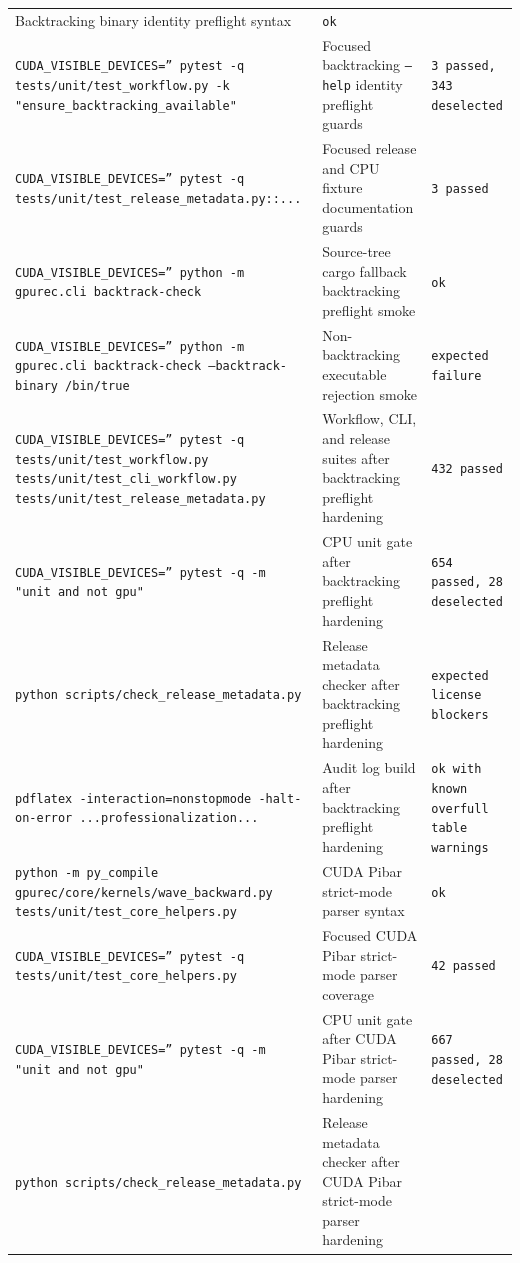\documentclass[11pt]{article}
\begin{document}
\begin{center}
\begin{tabular}{lll}
Backtracking binary identity preflight syntax &
\texttt{ok} \\
\texttt{CUDA\_VISIBLE\_DEVICES='' pytest -q tests/unit/test\_workflow.py -k "ensure\_backtracking\_available"} &
Focused backtracking \texttt{--help} identity preflight guards &
\texttt{3 passed, 343 deselected} \\
\texttt{CUDA\_VISIBLE\_DEVICES='' pytest -q tests/unit/test\_release\_metadata.py::...} &
Focused release and CPU fixture documentation guards &
\texttt{3 passed} \\
\texttt{CUDA\_VISIBLE\_DEVICES='' python -m gpurec.cli backtrack-check} &
Source-tree cargo fallback backtracking preflight smoke &
\texttt{ok} \\
\texttt{CUDA\_VISIBLE\_DEVICES='' python -m gpurec.cli backtrack-check --backtrack-binary /bin/true} &
Non-backtracking executable rejection smoke &
\texttt{expected failure} \\
\texttt{CUDA\_VISIBLE\_DEVICES='' pytest -q tests/unit/test\_workflow.py tests/unit/test\_cli\_workflow.py tests/unit/test\_release\_metadata.py} &
Workflow, CLI, and release suites after backtracking preflight hardening &
\texttt{432 passed} \\
\texttt{CUDA\_VISIBLE\_DEVICES='' pytest -q -m "unit and not gpu"} &
CPU unit gate after backtracking preflight hardening &
\texttt{654 passed, 28 deselected} \\
\texttt{python scripts/check\_release\_metadata.py} &
Release metadata checker after backtracking preflight hardening &
\texttt{expected license blockers} \\
\texttt{pdflatex -interaction=nonstopmode -halt-on-error ...professionalization...} &
Audit log build after backtracking preflight hardening &
\texttt{ok with known overfull table warnings} \\
\texttt{python -m py\_compile gpurec/core/kernels/wave\_backward.py tests/unit/test\_core\_helpers.py} &
CUDA Pibar strict-mode parser syntax &
\texttt{ok} \\
\texttt{CUDA\_VISIBLE\_DEVICES='' pytest -q tests/unit/test\_core\_helpers.py} &
Focused CUDA Pibar strict-mode parser coverage &
\texttt{42 passed} \\
\texttt{CUDA\_VISIBLE\_DEVICES='' pytest -q -m "unit and not gpu"} &
CPU unit gate after CUDA Pibar strict-mode parser hardening &
\texttt{667 passed, 28 deselected} \\
\texttt{python scripts/check\_release\_metadata.py} &
Release metadata checker after CUDA Pibar strict-mode parser hardening &

\end{tabular}
\end{center}
\end{document}
